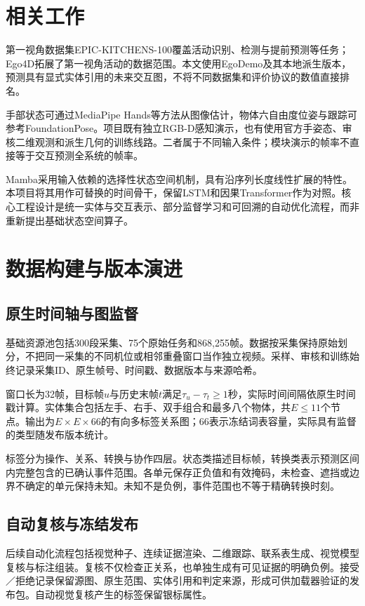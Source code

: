 \documentclass[10pt,twocolumn,letterpaper]{article}
\begin{document}
\section{相关工作}
第一视角数据集EPIC-KITCHENS-100覆盖活动识别、检测与提前预测等任务\cite{damen2022rescaling}；Ego4D拓展了第一视角活动的数据范围\cite{grauman2022ego4d}。本文使用EgoDemo及其本地派生版本\cite{egodemo}，预测具有显式实体引用的未来交互图，不将不同数据集和评价协议的数值直接排名。

手部状态可通过MediaPipe Hands等方法从图像估计\cite{zhang2020mediapipe}，物体六自由度位姿与跟踪可参考FoundationPose\cite{wen2024foundationpose}。项目既有独立RGB-D感知演示，也有使用官方手姿态、审核二维观测和派生几何的训练线路。二者属于不同输入条件；模块演示的帧率不直接等于交互预测全系统的帧率。

Mamba采用输入依赖的选择性状态空间机制，具有沿序列长度线性扩展的特性\cite{gu2023mamba}。本项目将其用作可替换的时间骨干，保留LSTM和因果Transformer作为对照。核心工程设计是统一实体与交互表示、部分监督学习和可回溯的自动优化流程，而非重新提出基础状态空间算子。

\section{数据构建与版本演进}
\subsection{原生时间轴与图监督}
基础资源池包括300段采集、75个原始任务和868,255帧。数据按采集保持原始划分，不把同一采集的不同机位或相邻重叠窗口当作独立视频。采样、审核和训练始终记录采集ID、原生帧号、时间戳、数据版本与来源哈希。

窗口长为32帧，目标帧$u$与历史末帧$t$满足$\tau_u-\tau_t\geq1$秒，实际时间间隔依原生时间戳计算。实体集合包括左手、右手、双手组合和最多八个物体，共$E\leq11$个节点。输出为$E\times E\times66$的有向多标签关系图；66表示冻结词表容量，实际具有监督的类型随发布版本统计。

标签分为操作、关系、转换与协作四层。状态类描述目标帧，转换类表示预测区间内完整包含的已确认事件范围。各单元保存正负值和有效掩码，未检查、遮挡或边界不确定的单元保持未知。未知不是负例，事件范围也不等于精确转换时刻。

\subsection{自动复核与冻结发布}
后续自动化流程包括视觉种子、连续证据渲染、二维跟踪、联系表生成、视觉模型复核与标注组装。复核不仅检查正关系，也单独生成有可见证据的明确负例。接受／拒绝记录保留源图、原生范围、实体引用和判定来源，形成可供加载器验证的发布包。自动视觉复核产生的标签保留银标属性。
\end{document}
